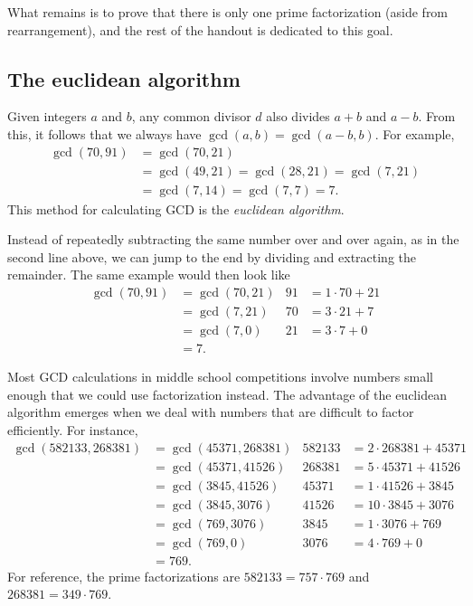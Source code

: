 What remains is to prove that there is only one prime factorization (aside from rearrangement), and the rest of the handout is dedicated to this goal.


\subsection{The euclidean algorithm}

Given integers $a$ and $b$, any common divisor $d$ also divides $a + b$ and $a - b$. From this, it follows that we always have $\gcd(a,b) = \gcd(a - b, b)$. For example,
\begin{align*}
\gcd(70,91) &= \gcd(70,21) \\
&= \gcd(49,21) = \gcd(28,21) = \gcd(7,21) \\
&= \gcd(7,14) = \gcd(7,7) = \boxed{7}.
\end{align*}
This method for calculating GCD is the \emph{euclidean algorithm}.

Instead of repeatedly subtracting the same number over and over again, as in the second line above, we can jump to the end by dividing and extracting the remainder. The same example would then look like
\begin{align*}
\gcd(70,91) &= \gcd(70,21) & 91 &= 1\cdot 70 + 21 \\
&= \gcd(7,21) & 70 &= 3\cdot 21 + 7 \\
&= \gcd(7,0) & 21 &= 3\cdot 7 + 0 \\
&= \boxed{7}.
\end{align*}

\begin{remark}
Most GCD calculations in middle school competitions involve numbers small enough that we could use factorization instead. The advantage of the euclidean algorithm emerges when we deal with numbers that are difficult to factor efficiently. For instance,
\begin{align*}
\gcd(582133, 268381) &= \gcd(45371, 268381) & 582133 &= 2\cdot 268381 + 45371 \\
&= \gcd(45371, 41526) & 268381 &= 5\cdot 45371 + 41526 \\
&= \gcd(3845, 41526) & 45371 &= 1\cdot 41526 + 3845 \\
&= \gcd(3845, 3076) & 41526 &= 10\cdot 3845 + 3076 \\
&= \gcd(769, 3076) & 3845 &= 1\cdot 3076 + 769 \\
&= \gcd(769, 0) & 3076 &= 4\cdot 769 + 0 \\
&= \boxed{769}.
\end{align*}
For reference, the prime factorizations are $582133 = 757\cdot 769$ and $268381 = 349\cdot 769$.
\end{remark}


